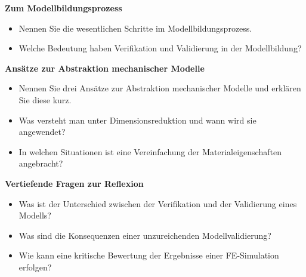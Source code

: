 \begin{framed}
\textbf{Zum Modellbildungsprozess}

\begin{itemize}
\item Nennen Sie die wesentlichen Schritte im Modellbildungsprozess.
\item Welche Bedeutung haben Verifikation und Validierung in der Modellbildung?
\end{itemize}

\textbf{Ansätze zur Abstraktion mechanischer Modelle}

\begin{itemize}
\item Nennen Sie drei Ansätze zur Abstraktion mechanischer Modelle und erklären Sie diese kurz.
\item Was versteht man unter Dimensionsreduktion und wann wird sie angewendet?
\item In welchen Situationen ist eine Vereinfachung der Materialeigenschaften angebracht?
\end{itemize}

\textbf{Vertiefende Fragen zur Reflexion}

\begin{itemize}
\item Was ist der Unterschied zwischen der Verifikation und der Validierung eines Modells?
\item Was sind die Konsequenzen einer unzureichenden Modellvalidierung?
\item Wie kann eine kritische Bewertung der Ergebnisse einer FE-Simulation erfolgen?
\end{itemize}
\end{framed}